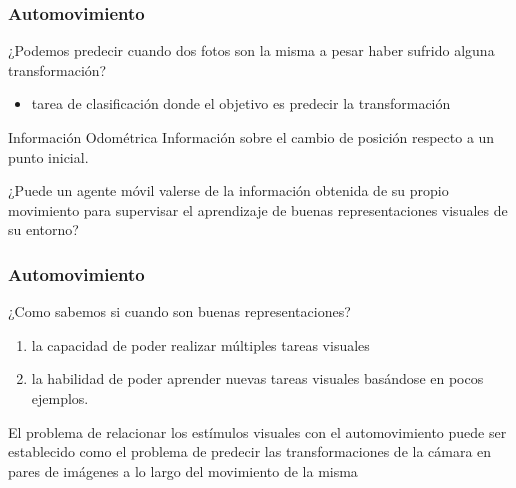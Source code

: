 \documentclass{beamer}
\begin{document}
\begin{frame}
\frametitle{Automovimiento}

¿Podemos predecir cuando dos fotos son la misma a pesar haber sufrido alguna transformación?\\

\vfill

\begin{itemize}
    \item tarea de clasificación donde el objetivo es predecir la transformación 
\end{itemize}

\vfill

\begin{block}{Información Odométrica}
Información sobre el cambio de posición respecto a un punto inicial.
\end{block}
\vfill

¿Puede un agente móvil valerse de la información obtenida de su propio movimiento para
supervisar el aprendizaje de buenas representaciones visuales de su
entorno?
\end{frame}





\begin{frame}
\frametitle{Automovimiento}

¿Como sabemos si cuando son buenas representaciones?\\\pause

\vfill
\begin{enumerate}
    \item la capacidad de poder realizar múltiples tareas visuales
    \item la habilidad de poder aprender nuevas tareas visuales basándose en pocos ejemplos.
\end{enumerate}\pause
\vfill

\begin{block}{}
El problema de relacionar los estímulos visuales con el automovimiento puede ser establecido como el problema de predecir las transformaciones de la cámara en pares de imágenes a lo largo del movimiento de la misma
\end{block}
\vfill
\end{frame}
\end{document}
